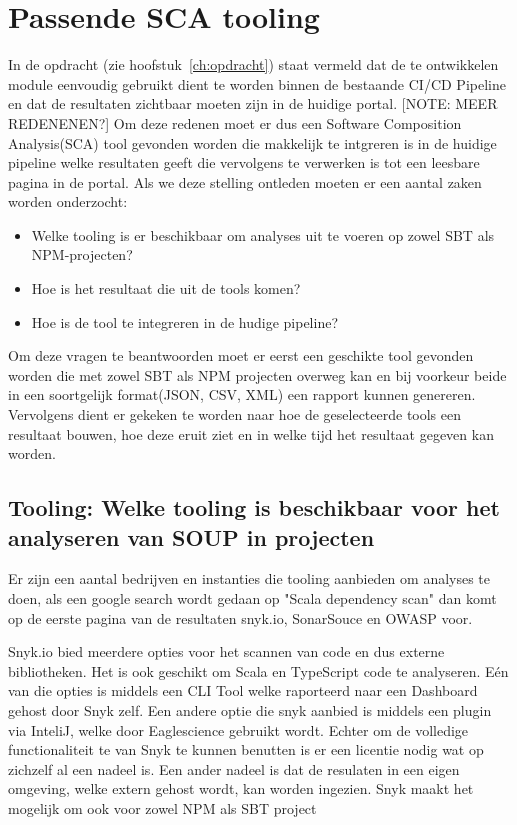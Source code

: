 \section{Passende SCA tooling}\label{sec:sca-tooling}

In de opdracht (zie hoofstuk~\ref{ch:opdracht}) staat vermeld dat de te ontwikkelen module eenvoudig gebruikt dient te worden binnen de bestaande CI/CD Pipeline en dat de resultaten zichtbaar moeten zijn in de huidige portal. [NOTE: MEER REDENENEN?] Om deze redenen moet er dus een Software Composition Analysis(SCA) tool gevonden worden die makkelijk te intgreren is in de huidige pipeline welke resultaten geeft die vervolgens te verwerken is tot een leesbare pagina in de portal. Als we deze stelling ontleden moeten er een aantal zaken worden onderzocht:
\begin{itemize}
    \item Welke tooling is er beschikbaar om analyses uit te voeren op zowel SBT als NPM-projecten?
    \item Hoe is het resultaat die uit de tools komen?
    \item Hoe is de tool te integreren in de hudige pipeline?
\end{itemize}
Om deze vragen te beantwoorden moet er eerst een geschikte tool gevonden worden die met zowel SBT als NPM projecten overweg kan en bij voorkeur beide in een soortgelijk format(JSON, CSV, XML) een rapport kunnen genereren. Vervolgens dient er gekeken te worden naar hoe de geselecteerde tools een resultaat bouwen, hoe deze eruit ziet en in welke tijd het resultaat gegeven kan worden.

\subsection{Tooling: Welke tooling is beschikbaar voor het analyseren van SOUP in projecten}\label{subsec:ESTooling}
Er zijn een aantal bedrijven en instanties die tooling aanbieden om analyses te doen, als een google search wordt gedaan op "Scala dependency scan" dan komt op de eerste pagina van de resultaten snyk.io, SonarSouce en OWASP voor.

Snyk.io bied meerdere opties voor het scannen van code en dus externe bibliotheken. Het is ook geschikt om Scala en TypeScript code te analyseren. Eén van die opties is middels een CLI Tool welke raporteerd naar een Dashboard gehost door Snyk zelf. Een andere optie die snyk aanbied is middels een plugin via InteliJ, welke door Eaglescience gebruikt wordt. Echter om de volledige functionaliteit te van Snyk te kunnen benutten is er een licentie nodig wat op zichzelf al een nadeel is. Een ander nadeel is dat de resulaten in een eigen omgeving, welke extern gehost wordt, kan worden ingezien. Snyk maakt het mogelijk om ook voor zowel NPM als SBT project

